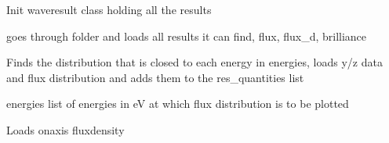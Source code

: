 \documentclass[letterpaper,10pt,english]{sphinxmanual}
\begin{document}
\begin{fulllineitems}
\label{\detokenize{autoapi/unduwave/index:unduwave.wave_results}}
\pysigstartsignatures
{}
\pysigstopsignatures
\sphinxAtStartPar
Init wave\sphinxhyphen{}result class holding all the results

\begin{fulllineitems}
\label{\detokenize{autoapi/unduwave/index:unduwave.wave_results.load_from_res_folder}}
\pysigstartsignatures
{}
\pysigstopsignatures
\sphinxAtStartPar
goes through folder and loads all results it can find, flux, flux\_d, brilliance

\end{fulllineitems}


\begin{fulllineitems}
\label{\detokenize{autoapi/unduwave/index:unduwave.wave_results.find_load_flux_density_distribution}}
\pysigstartsignatures
{}
\pysigstopsignatures
\sphinxAtStartPar
Finds the distribution that is closed to each energy in energies, loads y/z data and flux distribution and adds them to the
res\_quantities list

\sphinxAtStartPar
energies \sphinxhyphen{} list of energies in eV at which flux distribution is to be plotted

\end{fulllineitems}


\begin{fulllineitems}
\label{\detokenize{autoapi/unduwave/index:unduwave.wave_results.find_load_flux_density_on_axis}}
\pysigstartsignatures
{}
\pysigstopsignatures
\sphinxAtStartPar
Loads on\sphinxhyphen{}axis flux\sphinxhyphen{}density


\end{fulllineitems}
\end{fulllineitems}
\end{document}
